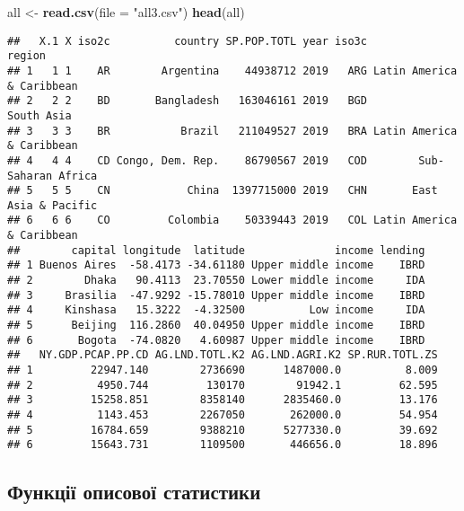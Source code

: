 \documentclass[
]{article}
\newenvironment{Shaded}{\begin{snugshade}}{\end{snugshade}}
\newcommand{\DataTypeTok}[1]{\textcolor[rgb]{0.13,0.29,0.53}{#1}}
\newcommand{\KeywordTok}[1]{\textcolor[rgb]{0.13,0.29,0.53}{\textbf{#1}}}
\newcommand{\NormalTok}[1]{#1}
\newcommand{\StringTok}[1]{\textcolor[rgb]{0.31,0.60,0.02}{#1}}
\begin{document}
\begin{Shaded}
\begin{Highlighting}[]
\NormalTok{all <-}\StringTok{ }\KeywordTok{read.csv}\NormalTok{(}\DataTypeTok{file =} \StringTok{"all3.csv"}\NormalTok{)}
\KeywordTok{head}\NormalTok{(all)}
\end{Highlighting}
\end{Shaded}

\begin{verbatim}
##   X.1 X iso2c          country SP.POP.TOTL year iso3c                    region
## 1   1 1    AR        Argentina    44938712 2019   ARG Latin America & Caribbean
## 2   2 2    BD       Bangladesh   163046161 2019   BGD                South Asia
## 3   3 3    BR           Brazil   211049527 2019   BRA Latin America & Caribbean
## 4   4 4    CD Congo, Dem. Rep.    86790567 2019   COD        Sub-Saharan Africa
## 5   5 5    CN            China  1397715000 2019   CHN       East Asia & Pacific
## 6   6 6    CO         Colombia    50339443 2019   COL Latin America & Caribbean
##        capital longitude  latitude              income lending
## 1 Buenos Aires  -58.4173 -34.61180 Upper middle income    IBRD
## 2        Dhaka   90.4113  23.70550 Lower middle income     IDA
## 3     Brasilia  -47.9292 -15.78010 Upper middle income    IBRD
## 4     Kinshasa   15.3222  -4.32500          Low income     IDA
## 5      Beijing  116.2860  40.04950 Upper middle income    IBRD
## 6       Bogota  -74.0820   4.60987 Upper middle income    IBRD
##   NY.GDP.PCAP.PP.CD AG.LND.TOTL.K2 AG.LND.AGRI.K2 SP.RUR.TOTL.ZS
## 1         22947.140        2736690      1487000.0          8.009
## 2          4950.744         130170        91942.1         62.595
## 3         15258.851        8358140      2835460.0         13.176
## 4          1143.453        2267050       262000.0         54.954
## 5         16784.659        9388210      5277330.0         39.692
## 6         15643.731        1109500       446656.0         18.896
\end{verbatim}

\hypertarget{ux444ux443ux43dux43aux446ux456ux457-ux43eux43fux438ux441ux43eux432ux43eux457-ux441ux442ux430ux442ux438ux441ux442ux438ux43aux438}{%
\subsection{Функції описової
статистики}\label{ux444ux443ux43dux43aux446ux456ux457-ux43eux43fux438ux441ux43eux432ux43eux457-ux441ux442ux430ux442ux438ux441ux442ux438ux43aux438}}
\end{document}
